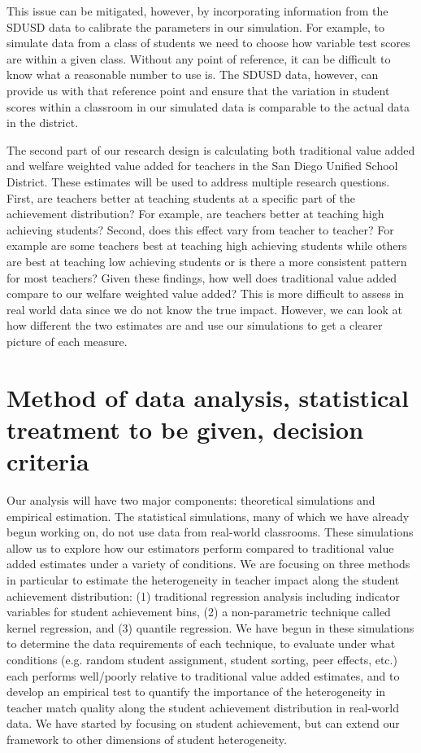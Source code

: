 \documentclass[letterpaper,12pt]{article}
\begin{document}
This issue can be mitigated, however, by incorporating information from the SDUSD data to calibrate the parameters in our simulation. For example, to simulate data from a class of students we need to choose how variable test scores are within a given class. Without any point of reference, it can be difficult to know what a reasonable number to use is. The SDUSD data, however, can provide us with that reference point and ensure that the variation in student scores within a classroom in our simulated data is comparable to the actual data in the district.

The second part of our research design is calculating both traditional value added and welfare weighted value added for teachers in the San Diego Unified School District. These estimates will be used to address multiple research questions. First, are teachers better at teaching students at a specific part of the achievement distribution? For example, are teachers better at teaching high achieving students?   Second, does this effect vary from teacher to teacher? For example are some teachers best at teaching high achieving students while others are best at teaching low achieving students or is there a more consistent pattern for most teachers? Given these findings, how well does traditional value added compare to our welfare weighted value added? This is more difficult to assess in real world data since we do not know the true impact. However, we can look at how different the two estimates are and use our simulations to get a clearer picture of each measure.





\section{Method of data analysis, statistical treatment to be given, decision criteria}
Our analysis will have two major components: theoretical simulations and empirical estimation. The statistical simulations, many of which we have already begun working on, do not use data from real-world classrooms. These simulations allow us to explore how our estimators perform compared to traditional value added estimates under a variety of conditions. We are focusing on three methods in particular to estimate the heterogeneity in teacher impact along the student achievement distribution: (1) traditional regression analysis including indicator variables for student achievement bins, (2) a non-parametric technique called kernel regression, and (3) quantile regression. We have begun in these simulations to determine the data requirements of each technique, to evaluate under what conditions (e.g. random student assignment, student sorting, peer effects, etc.) each performs well/poorly relative to traditional value added estimates, and to develop an empirical test to quantify the importance of the heterogeneity in teacher match quality along the student achievement distribution in real-world data. We have started by focusing on student achievement, but can extend our framework to other dimensions of student heterogeneity.
\end{document}

